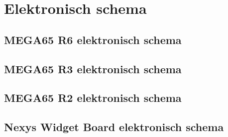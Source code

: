 \chapter{Elektronisch schema}
\section{MEGA65 R6 elektronisch schema}



\section{MEGA65 R3 elektronisch schema}

\section{MEGA65 R2 elektronisch schema}

\section{Nexys Widget Board elektronisch schema}
\label{sec:nexyswidgetschematics}


